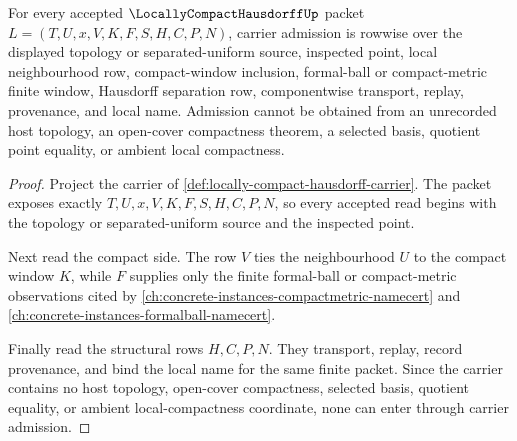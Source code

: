 \begin{theorem}
\label{thm:locally-compact-hausdorff-carrier-admission}
For every accepted $\LocallyCompactHausdorffUp$ packet $L=(T,U,x,V,K,F,S,H,C,P,N)$, carrier admission is rowwise over the displayed topology or separated-uniform source, inspected point, local neighbourhood row, compact-window inclusion, formal-ball or compact-metric finite window, Hausdorff separation row, componentwise transport, replay, provenance, and local name. Admission cannot be obtained from an unrecorded host topology, an open-cover compactness theorem, a selected basis, quotient point equality, or ambient local compactness.
\end{theorem}
\begin{proof}
Project the carrier of \autoref{def:locally-compact-hausdorff-carrier}. The packet exposes exactly $T,U,x,V,K,F,S,H,C,P,N$, so every accepted read begins with the topology or separated-uniform source and the inspected point.

Next read the compact side. The row $V$ ties the neighbourhood $U$ to the compact window $K$, while $F$ supplies only the finite formal-ball or compact-metric observations cited by \autoref{ch:concrete-instances-compactmetric-namecert} and \autoref{ch:concrete-instances-formalball-namecert}.

Finally read the structural rows $H,C,P,N$. They transport, replay, record provenance, and bind the local name for the same finite packet. Since the carrier contains no host topology, open-cover compactness, selected basis, quotient equality, or ambient local-compactness coordinate, none can enter through carrier admission.
\end{proof}

